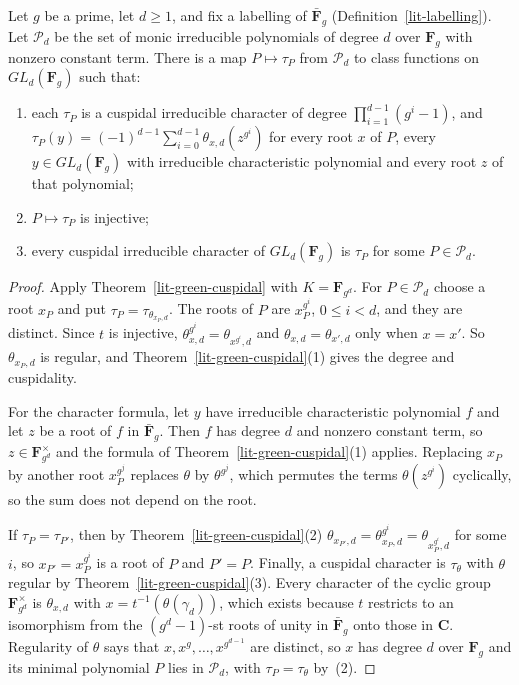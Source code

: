 \begin{corollary}\label{lit-green-labelled}
Let $g$ be a prime, let $d\ge1$, and fix a labelling of $\bar{\mathbf F}_g$
(Definition~\ref{lit-labelling}). Let $\mathcal P_d$ be the set of monic
irreducible polynomials of degree $d$ over $\mathbf F_g$ with nonzero constant
term. There is a map $P\mapsto\tau_P$ from $\mathcal P_d$ to class functions
on $GL_d(\mathbf F_g)$ such that:
\begin{enumerate}
\item each $\tau_P$ is a cuspidal irreducible character of degree
  $\prod_{i=1}^{d-1}(g^i-1)$, and
  $\tau_P(y)=(-1)^{d-1}\sum_{i=0}^{d-1}\theta_{x,d}(z^{g^i})$ for every root
  $x$ of $P$, every $y\in GL_d(\mathbf F_g)$ with irreducible characteristic
  polynomial and every root $z$ of that polynomial;
\item $P\mapsto\tau_P$ is injective;
\item every cuspidal irreducible character of $GL_d(\mathbf F_g)$ is $\tau_P$
  for some $P\in\mathcal P_d$.
\end{enumerate}
\end{corollary}
\begin{proof}
Apply Theorem~\ref{lit-green-cuspidal} with $K=\mathbf F_{g^d}$. For
$P\in\mathcal P_d$ choose a root $x_P$ and put
$\tau_P=\tau_{\theta_{x_P,d}}$. The roots of $P$ are
$x_P^{g^i}$, $0\le i<d$, and they are distinct. Since $t$ is injective,
$\theta_{x,d}^{g^i}=\theta_{x^{g^i},d}$ and $\theta_{x,d}=\theta_{x',d}$ only
when $x=x'$. So $\theta_{x_P,d}$ is regular, and
Theorem~\ref{lit-green-cuspidal}(1) gives the degree and cuspidality.

For the character formula, let $y$ have irreducible characteristic
polynomial $f$ and let $z$ be a root of $f$ in $\bar{\mathbf F}_g$. Then $f$
has degree $d$ and nonzero constant term, so $z\in\mathbf F_{g^d}^\times$ and
the formula of Theorem~\ref{lit-green-cuspidal}(1) applies. Replacing $x_P$ by
another root $x_P^{g^j}$ replaces $\theta$ by $\theta^{g^j}$, which permutes
the terms $\theta(z^{g^i})$ cyclically, so the sum does not depend on the root.

If $\tau_P=\tau_{P'}$, then by Theorem~\ref{lit-green-cuspidal}(2)
$\theta_{x_{P'},d}=\theta_{x_P,d}^{g^i}=\theta_{x_P^{g^i},d}$ for some $i$, so
$x_{P'}=x_P^{g^i}$ is a root of $P$ and $P'=P$. Finally, a cuspidal character
is $\tau_\theta$ with $\theta$ regular by
Theorem~\ref{lit-green-cuspidal}(3). Every character of the cyclic group
$\mathbf F_{g^d}^\times$ is $\theta_{x,d}$ with $x=t^{-1}(\theta(\gamma_d))$,
which exists because $t$ restricts to an isomorphism from the
$(g^d-1)$-st roots of unity in $\bar{\mathbf F}_g$ onto those in $\mathbf C$.
Regularity of $\theta$ says that $x,x^g,\ldots,x^{g^{d-1}}$ are distinct, so
$x$ has degree $d$ over $\mathbf F_g$ and its minimal polynomial $P$ lies in
$\mathcal P_d$, with $\tau_P=\tau_\theta$ by~(2).
\end{proof}

